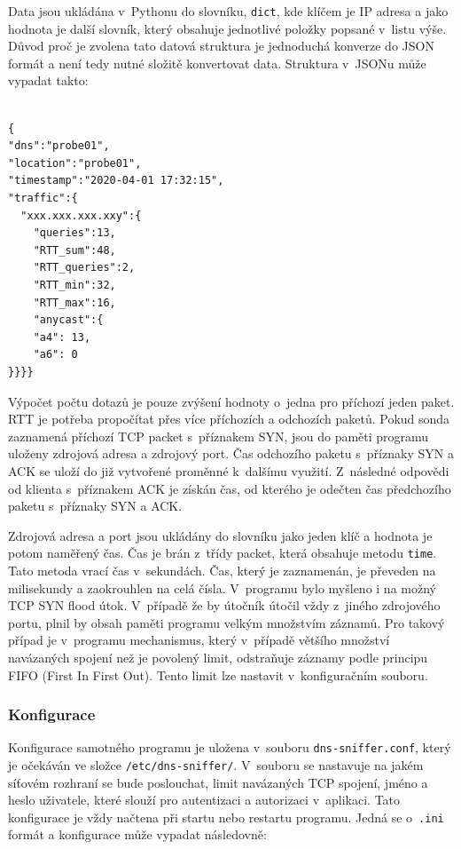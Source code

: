\documentclass[thesis=M,czech]{src/FITthesis}[2019/12/23]
\begin{document}
Data jsou ukládána v~Pythonu do slovníku, \texttt{dict}, kde klíčem je IP adresa a jako hodnota je další slovník, který obsahuje jednotlivé položky popsané v~listu výše. Důvod proč je zvolena tato datová struktura je jednoduchá konverze do JSON formát a není tedy nutné složitě konvertovat data. Struktura v~JSONu může vypadat takto: 


\begin{verbatim}

{
"dns":"probe01",
"location":"probe01",
"timestamp":"2020-04-01 17:32:15",
"traffic":{
  "xxx.xxx.xxx.xxy":{
    "queries":13,
    "RTT_sum":48,
    "RTT_queries":2,
    "RTT_min":32,
    "RTT_max":16,
    "anycast":{
    "a4": 13,
    "a6": 0
}}}}
\end{verbatim}

Výpočet počtu dotazů je pouze zvýšení hodnoty o~jedna pro příchozí jeden paket. RTT je potřeba propočítat přes více příchozích a odchozích paketů. Pokud sonda zaznamená příchozí TCP packet s~příznakem SYN, jsou do paměti programu uloženy  zdrojová adresa a zdrojový port. Čas odchozího paketu s~příznaky SYN a ACK se uloží do již vytvořené proměnné k~dalšímu využití. Z~následné odpovědi od klienta s~příznakem ACK je získán čas, od kterého je odečten čas předchozího paketu s~příznaky SYN a ACK.

Zdrojová adresa a port jsou ukládány do slovníku jako jeden klíč a hodnota je potom naměřený čas. Čas je brán z~třídy packet, která obsahuje metodu \texttt{time}. Tato metoda vrací čas v~sekundách. Čas, který je zaznamenán, je převeden na milisekundy a zaokrouhlen na celá čísla. V~programu bylo myšleno i na možný TCP SYN flood útok. V~případě že by útočník útočil vždy z~jiného zdrojového portu, plnil by obsah paměti programu velkým množstvím záznamů. Pro takový případ je v~programu mechanismus, který v~případě většího množství navázaných spojení než je povolený limit, odstraňuje záznamy podle principu FIFO (First In First Out). Tento limit lze nastavit v~konfiguračním souboru.

\subsubsection{Konfigurace}
\label{sec:probeConf}
Konfigurace samotného programu je uložena v~souboru \texttt{dns-sniffer.conf}, který je očekáván ve složce \texttt{/etc/dns-sniffer/}. V~souboru se nastavuje na jakém síťovém rozhraní se bude poslouchat, limit navázaných TCP spojení, jméno a heslo uživatele, které slouží pro autentizaci a autorizaci v~aplikaci. Tato konfigurace je vždy načtena při startu nebo restartu programu. Jedná se o~\texttt{.ini} formát a konfigurace může vypadat následovně: 
\end{document}
